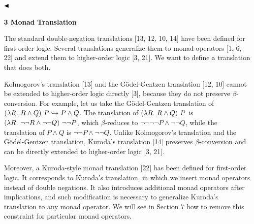  
  
$\hfill\blacktriangleleft$\par
 
 
 
 


 
\par\medskip\noindent\textbf{3 Monad Translation}\par
 
 
The standard double-negation translations [13, 12, 10, 14] have been defined for first-order logic. Several translations generalize them to monad operators [1, 6, 22] and extend them to higher-order logic [3, 21]. We want to define a translation that does both.\par
 
 
 
Kolmogorov’s translation [13] and the Gödel-Gentzen translation [12, 10] cannot be extended to higher-order logic directly [3], because they do not preserve $\beta$-conversion. For example, let us take the Gödel-Gentzen translation of $(\lambda R.\leavevmode\nobreak\ R\mathbin{\wedge}Q)\leavevmode\nobreak\ P\hookrightarrow P\mathbin{\wedge}Q$. The translation of $(\lambda R.\leavevmode\nobreak\ R\mathbin{\wedge}Q)\leavevmode\nobreak\ P$ is $(\lambda R.\leavevmode\nobreak\ \neg\neg R\mathbin{\wedge}\neg\neg Q)\leavevmode\nobreak\ \neg\neg P$, which $\beta$-reduces to $\neg\neg\neg\neg P\mathbin{\wedge}\neg\neg Q$, while the translation of $P\mathbin{\wedge}Q$ is $\neg\neg P\mathbin{\wedge}\neg\neg Q$. Unlike Kolmogorov’s translation and the Gödel-Gentzen translation, Kuroda’s translation [14] preserves $\beta$-conversion and can be directly extended to higher-order logic [3, 21].\par
 
 
 
Moreover, a Kuroda-style monad translation [22] has been defined for first-order logic. It corresponds to Kuroda’s translation, in which we insert monad operators instead of double negations. It also introduces additional monad operators after implications, and such modification is necessary to generalize Kuroda’s translation to any monad operator. We will see in Section 7 how to remove this constraint for particular monad operators.\par
 
